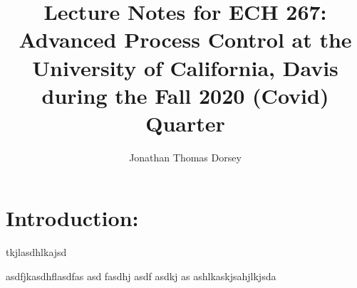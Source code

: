 \documentclass[a4paper, twocolumn, 12 pt]{article}
\begin{document}
\title{Lecture Notes for ECH 267: Advanced Process Control at the University of California, Davis during the Fall 2020 (Covid) Quarter}
\author{ Jonathan Thomas Dorsey}


\maketitle{}

\section{Introduction:}
tkjlasdhlkajsd


asdfjkasdhflasdfas  asd fasdhj asdf asdkj as ashlkaskjsahjlkjsda
\end{document}
